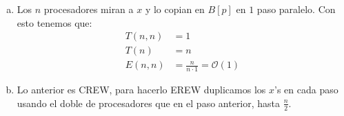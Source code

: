 \documentclass[dcc,uchile]{fcfmcourse}
\begin{document}
\newpage
\begin{problems}
\problem
\begin{enumerate}[a)]
\item
Los $n$ procesadores miran a $x$ y lo copian en $B[p]$ en $1$ paso paralelo.
Con esto tenemos que:
\begin{align*}
    T(n,n) &= 1\\
	T(n) &= n\\
	E(n,n) &= \frac{n}{n\cdot 1} = \mathcal{O}(1)
\end{align*}
\item 
Lo anterior es CREW, para hacerlo EREW duplicamos los $x$'s en cada paso usando el doble de procesadores que en el paso anterior, hasta $\frac{n}{2}$.\\
\begin{algorithm}[H]


\end{algorithm}
\end{enumerate}
\end{problems}
\end{document}
